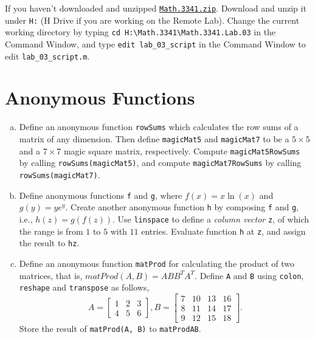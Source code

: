 If you haven't downloaded and unzipped \href{https://libaoj.in/courses/2021f/MATH3341/zip/Math.3341.zip}{\texttt{Math.3341.zip}}. Download and unzip it under \verb|H:| (H Drive if you are working on the Remote Lab). Change the current working directory by typing \verb|cd H:\Math.3341\Math.3341.Lab.03| in the Command Window, and type \verb|edit lab_03_script| in the Command Window to edit \verb|lab_03_script.m|.


\section{Anonymous Functions}
\begin{enumerate}[(a)]
  \item Define an anonymous function \verb|rowSums| which calculates the row sums of a matrix of any dimension. Then define \verb|magicMat5| and \verb|magicMat7| to be a $5 \times 5$ and a $7 \times 7$ magic square matrix, respectively. Compute \verb|magicMat5RowSums| by calling \verb|rowSums(magicMat5)|, and compute \verb|magicMat7RowSums| by calling \verb|rowSums(magicMat7)|.
  \item Define anonymous functions \verb|f| and \verb|g|, where $f(x) = x \ln(x)$ and $g(y) = y e^{y}$. Create another anonymous function \verb|h| by composing \verb|f| and \verb|g|, i.e., $h(z) = g(f(z))$. Use \verb|linspace| to define a \emph{column vector} \verb|z|, of which the range is from $1$ to $5$ with $11$ entries. Evaluate function \verb|h| at \verb|z|, and assign the result to \verb|hz|.
  \item Define an anonymous function \verb|matProd| for calculating the product of two matrices, that is, $matProd(A, B) = ABB^{T} A^{T}$. Define \verb|A| and \verb|B| using \verb|colon|, \verb|reshape| and \verb|transpose| as follows,
    \begin{equation*}
      A = \begin{bmatrix}
        1 & 2 & 3 \\
        4 & 5 & 6
      \end{bmatrix},
      B = \begin{bmatrix}
        7 & 10 & 13 & 16 \\
        8 & 11 & 14 & 17 \\
        9 & 12 & 15 & 18
      \end{bmatrix}.
    \end{equation*}
    Store the result of \verb|matProd(A, B)| to \verb|matProdAB|.

\end{enumerate}
